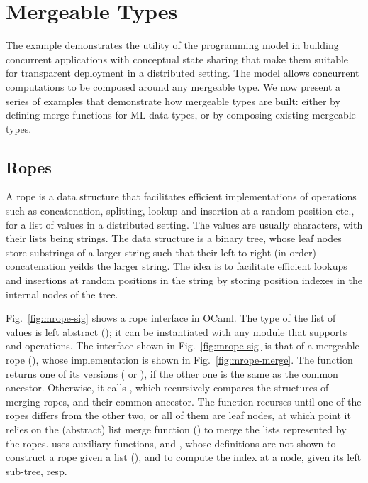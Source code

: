 \section{Mergeable Types}
\label{sec:mergeable_types}



The \drawsome example demonstrates the utility of the \name
programming model in building concurrent applications with conceptual
state sharing that make them suitable for transparent deployment in a
distributed setting. The model allows concurrent computations to be
composed around any mergeable type. We now present a series of
examples that demonstrate how mergeable types are built: either by
defining merge functions for ML data types, or by composing existing
mergeable types.

\subsection{Ropes}
\label{sec:ropes}

A rope is a data structure that facilitates efficient implementations
of operations such as concatenation, splitting, lookup and insertion
at a random position etc., for a list of values in a distributed
setting. The values are usually characters, with their lists being
strings. The data structure is a binary tree, whose leaf nodes store
substrings of a larger string such that their left-to-right (in-order)
concatenation yeilds the larger string. The idea is to facilitate
efficient lookups and insertions at random positions in the string by
storing position indexes in the internal nodes of the tree.

Fig.~\ref{fig:mrope-sig} shows a rope interface in OCaml. The type of
the list of values is left abstract (); it can be instantiated
with any module that supports  and  operations. The
interface shown in Fig.~\ref{fig:mrope-sig} is that of a mergeable
rope (), whose  implementation is shown in
Fig.~\ref{fig:mrope-merge}. The function returns one of its versions
( or ), if the other one is the same as the common
ancestor. Otherwise, it calls , which recursively
compares the structures of merging ropes, and their common ancestor.
The function recurses until one of the ropes differs from the other
two, or all of them are leaf nodes, at which point it relies on the
(abstract) list merge function () to merge the lists
represented by the ropes.  uses auxiliary functions,
 and , whose definitions are not shown to
construct a rope given a list (), and to compute the index at a
node, given its left sub-tree, resp.

